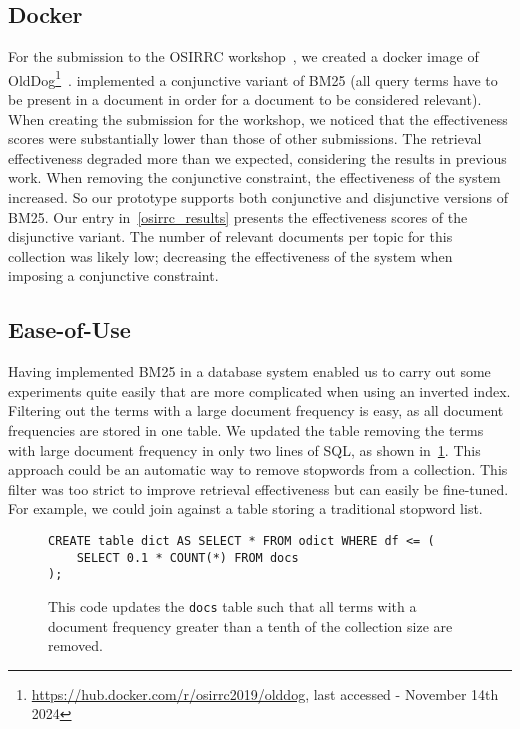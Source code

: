 \subsection{Docker}
For the submission to the OSIRRC workshop~\citep{OSIRRC}, we created a docker image of OldDog\footnote{\url{https://hub.docker.com/r/osirrc2019/olddog}, last accessed - November 14th 2024}~\citep{olddog-docker}.  implemented a conjunctive variant of BM25 (all query terms have to be present in a document in order for a document to be considered relevant). When creating the submission for the workshop, we noticed that the effectiveness scores were substantially lower than those of other submissions. The retrieval effectiveness degraded more than we expected, considering the results in previous work. When removing the conjunctive constraint, the effectiveness of the system increased. So our prototype supports both conjunctive and disjunctive versions of BM25. Our entry in~\cref{osirrc_results} presents the effectiveness scores of the disjunctive variant. The number of relevant documents per topic for this collection was likely low; decreasing the effectiveness of the system when imposing a conjunctive constraint.

\subsection{Ease-of-Use}
Having implemented BM25 in a database system enabled us to carry out some experiments quite easily that are more complicated when using an inverted index. Filtering out the terms with a large document frequency is easy, as all document frequencies are stored in one table. We updated the table removing the terms with large document frequency in only two lines of SQL, as shown in~\cref{fig:remove-high-df}. This approach could be an automatic way to remove stopwords from a collection. This filter was too strict to improve retrieval effectiveness but can easily be fine-tuned. For example, we could join against a table storing a traditional stopword list. 

\begin{figure}
	\begin{verbatim}
CREATE table dict AS SELECT * FROM odict WHERE df <= (
	SELECT 0.1 * COUNT(*) FROM docs
);		
	\end{verbatim}
	\caption{This code updates the \texttt{docs} table such that all terms with a document frequency greater than a tenth of the collection size are removed.}
	\label{fig:remove-high-df}
\end{figure}

